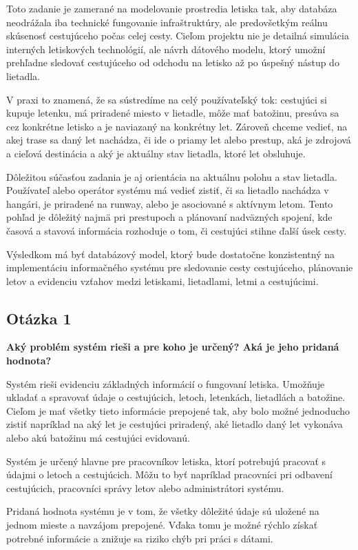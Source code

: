 \documentclass[11pt, a4paper]{article}
\begin{document}
Toto zadanie je zamerané na modelovanie prostredia letiska tak, aby databáza
neodrážala iba technické fungovanie infraštruktúry, ale predovšetkým reálnu
skúsenosť cestujúceho počas celej cesty. Cieľom projektu nie je detailná
simulácia interných letiskových technológií, ale návrh dátového modelu, ktorý
umožní prehľadne sledovať cestujúceho od odchodu na letisko až po úspešný
nástup do lietadla.

V praxi to znamená, že sa sústredíme na celý používateľský tok: cestujúci si
kupuje letenku, má priradené miesto v lietadle, môže mať batožinu, presúva sa
cez konkrétne letisko a je naviazaný na konkrétny let. Zároveň chceme vedieť,
na akej trase sa daný let nachádza, či ide o priamy let alebo prestup, aká je
zdrojová a cieľová destinácia a aký je aktuálny stav lietadla, ktoré let
obsluhuje.

Dôležitou súčasťou zadania je aj orientácia na aktuálnu polohu a stav lietadla.
Používateľ alebo operátor systému má vedieť zistiť, či sa lietadlo nachádza v
hangári, je priradené na runway, alebo je asociované s aktívnym letom. Tento
pohľad je dôležitý najmä pri prestupoch a plánovaní nadväzných spojení, kde
časová a stavová informácia rozhoduje o tom, či cestujúci stihne ďalší úsek
cesty.


Výsledkom má byť databázový model, ktorý bude dostatočne konzistentný na
implementáciu informačného systému pre sledovanie cesty cestujúceho, plánovanie
letov a evidenciu vzťahov medzi letiskami, lietadlami, letmi a cestujúcimi.

\subsection*{Otázka 1}
\textbf{Aký problém systém rieši a pre koho je určený? Aká je jeho pridaná hodnota?}

Systém rieši evidenciu základných informácií o fungovaní letiska. Umožňuje
ukladať a spravovať údaje o cestujúcich, letoch, letenkách, lietadlách a
batožine. Cieľom je mať všetky tieto informácie prepojené tak, aby bolo možné
jednoducho zistiť napríklad na aký let je cestujúci priradený, aké lietadlo
daný let vykonáva alebo akú batožinu má cestujúci evidovanú.

Systém je určený hlavne pre pracovníkov letiska, ktorí potrebujú pracovať s
údajmi o letoch a cestujúcich. Môžu to byť napríklad pracovníci pri odbavení
cestujúcich, pracovníci správy letov alebo administrátori systému.

Pridaná hodnota systému je v tom, že všetky dôležité údaje sú uložené na jednom
mieste a navzájom prepojené. Vďaka tomu je možné rýchlo získať potrebné
informácie a znižuje sa riziko chýb pri práci s dátami.
\end{document}
